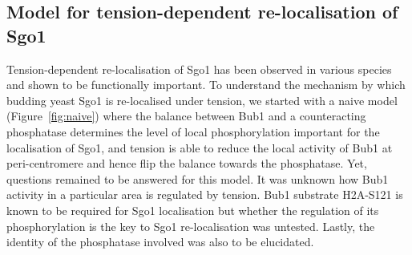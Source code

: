 \subsection{Model for tension-dependent re-localisation of Sgo1}

Tension-dependent re-localisation of Sgo1 has been observed in various species and shown to be functionally important. To understand the mechanism by which budding yeast Sgo1 is re-localised under tension, we started with a naive model (Figure~\ref{fig:naive}) where the balance between Bub1 and a counteracting phosphatase determines the level of local phosphorylation important for the localisation of Sgo1, and tension is able to reduce the local activity of Bub1 at peri-centromere and hence flip the balance towards the phosphatase. Yet, questions remained to be answered for this model. It was unknown how Bub1 activity in a particular area is regulated by tension. Bub1 substrate H2A-S121 is known to be required for Sgo1 localisation but whether the regulation of its phosphorylation is the key to Sgo1 re-localisation was untested. Lastly, the identity of the phosphatase involved was also to be elucidated. 

